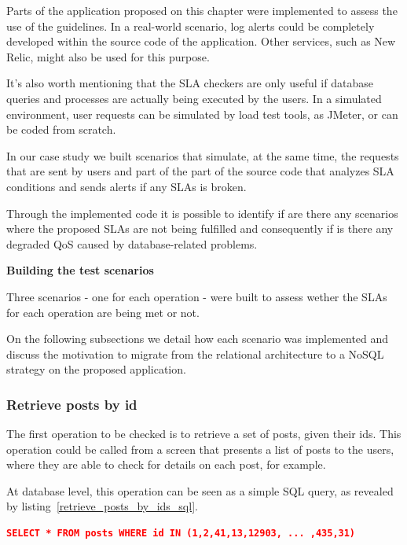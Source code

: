 Parts of the application proposed on this chapter were implemented to assess the use of the guidelines. In a real-world scenario, log alerts could be completely developed within the source code of the application. Other services, such as New Relic, might also be used for this purpose. 

It's also worth mentioning that the SLA checkers are only useful if database queries and processes are actually being executed by the users. In a simulated environment, user requests can be simulated by load test tools, as JMeter, or can be coded from scratch.

In our case study we built scenarios that simulate, at the same time, the requests that are sent by users and part of the part of the source code that analyzes SLA conditions and sends alerts if any SLAs is broken. 

Through the implemented code it is possible to identify if are there any scenarios where the proposed SLAs are not being fulfilled and consequently if is there any degraded QoS caused by database-related problems.

\textbf{Building the test scenarios}

Three scenarios - one for each operation - were built to assess wether the SLAs for each operation are being met or not.

On the following subsections we detail how each scenario was implemented and discuss the motivation to migrate from the relational architecture to a NoSQL strategy on the proposed application. 


\clearpage
\subsubsection{Retrieve posts by id}

The first operation to be checked is to retrieve a set of posts, given their ids. This operation could be called from a screen that presents a list of posts to the users, where they are able to check for details on each post, for example. 

At database level, this operation can be seen as a simple SQL query, as revealed by listing~\ref{retrieve_posts_by_ids_sql}. 

\begin{lstlisting}[language=json,firstnumber=1, caption=SQL Query - Retrieve posts by ids, label=retrieve_posts_by_ids_sql]
SELECT * FROM posts WHERE id IN (1,2,41,13,12903, ... ,435,31)
\end{lstlisting}\label{query01}

